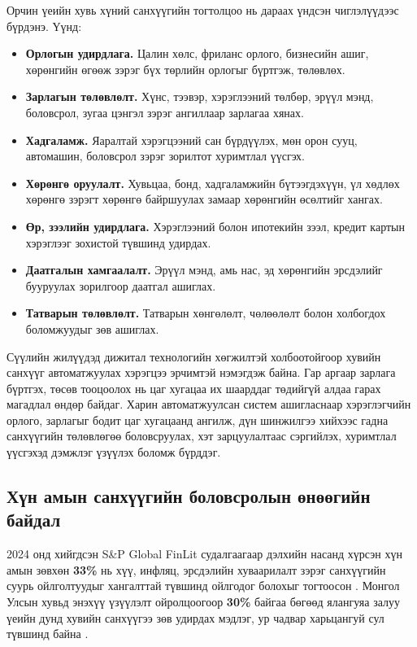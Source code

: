 Орчин үеийн хувь хүний санхүүгийн тогтолцоо нь дараах үндсэн чиглэлүүдээс бүрдэнэ. Үүнд:
\begin{itemize}
    \item [•] \textbf{Орлогын удирдлага.} Цалин хөлс, фриланс орлого, бизнесийн ашиг, хөрөнгийн өгөөж зэрэг бүх төрлийн орлогыг бүртгэж, төлөвлөх.
    \item [•] \textbf{Зарлагын төлөвлөлт.} Хүнс, тээвэр, хэрэглээний төлбөр, эрүүл мэнд, боловсрол, зугаа цэнгэл зэрэг ангиллаар зарлагаа хянах.
    \item [•] \textbf{Хадгаламж.} Яаралтай хэрэгцээний сан бүрдүүлэх, мөн орон сууц, автомашин, боловсрол зэрэг зорилтот хуримтлал үүсгэх.
    \item [•] \textbf{Хөрөнгө оруулалт.} Хувьцаа, бонд, хадгаламжийн бүтээгдэхүүн, үл хөдлөх хөрөнгө зэрэгт хөрөнгө байршуулах замаар хөрөнгийн өсөлтийг хангах.
    \item [•] \textbf{Өр, зээлийн удирдлага.} Хэрэглээний болон ипотекийн зээл, кредит картын хэрэглээг зохистой түвшинд удирдах.
    \item [•] \textbf{Даатгалын хамгаалалт.} Эрүүл мэнд, амь нас, эд хөрөнгийн эрсдэлийг бууруулах зорилгоор даатгал ашиглах.
    \item [•] \textbf{Татварын төлөвлөлт.} Татварын хөнгөлөлт, чөлөөлөлт болон холбогдох боломжуудыг зөв ашиглах.
\end{itemize}

Сүүлийн жилүүдэд дижитал технологийн хөгжилтэй холбоотойгоор хувийн санхүүг автоматжуулах хэрэгцээ эрчимтэй нэмэгдэж байна. Гар аргаар зарлага бүртгэх, төсөв тооцоолох нь цаг хугацаа их шаарддаг төдийгүй алдаа гарах магадлал өндөр байдаг. Харин автоматжуулсан систем ашигласнаар хэрэглэгчийн орлого, зарлагыг бодит цаг хугацаанд ангилж, дүн шинжилгээ хийхээс гадна санхүүгийн төлөвлөгөө боловсруулах, хэт зарцуулалтаас сэргийлэх, хуримтлал үүсгэхэд дэмжлэг үзүүлэх боломж бүрддэг.

\subsection{Хүн амын санхүүгийн боловсролын өнөөгийн байдал}
2024 онд хийгдсэн S\&P Global FinLit судалгаагаар дэлхийн насанд хүрсэн хүн амын зөвхөн \textbf{33\%} нь хүү, инфляц, эрсдэлийн хуваарилалт зэрэг санхүүгийн суурь ойлголтуудыг хангалттай түвшинд ойлгодог болохыг тогтоосон \cite{split_finlit, worldbank_finlit}. Монгол Улсын хувьд энэхүү үзүүлэлт ойролцоогоор \textbf{30\%} байгаа бөгөөд ялангуяа залуу үеийн дунд хувийн санхүүгээ зөв удирдах мэдлэг, ур чадвар харьцангуй сул түвшинд байна \cite{mn_finlit_survey}.\\


